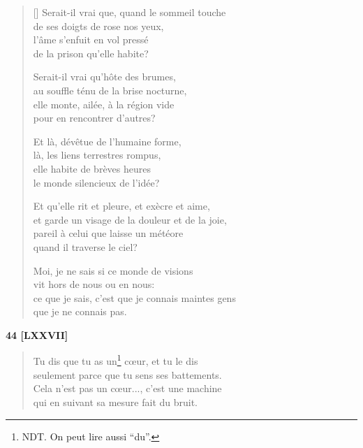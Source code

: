 \documentclass[a4paper,12pt]{book}
\begin{document}
\begin{verse}[\versewidth]
  Serait-il vrai que, quand le sommeil touche \\
  de ses doigts de rose nos yeux, \\
  l'âme s'enfuit en vol pressé \\
  de la prison qu'elle habite?

  Serait-il vrai qu'hôte des brumes, \\
  au souffle ténu de la brise nocturne, \\
  elle monte, ailée, à la région vide \\
  pour en rencontrer d'autres?

  Et là, dévêtue de l'humaine forme, \\
  là, les liens terrestres rompus, \\
  elle habite de brèves heures \\
  le monde silencieux de l'idée?

  Et qu'elle rit et pleure, et exècre et aime, \\
  et garde un visage de la douleur et de la joie, \\
  pareil à celui que laisse un météore \\
  quand il traverse le ciel?

  Moi, je ne sais si ce monde de visions \\
  vit hors de nous ou en nous: \\
  ce que je sais, c'est que je connais maintes gens \\
  que je ne connais pas.
\end{verse}


\bigskip

\begin{center} {\bf 44 [LXXVII]} \end{center}

\begin{verse}
Tu dis que tu as un\footnote{NDT. On peut lire aussi ``du''.} c{\oe}ur, et tu le dis \\
seulement parce que tu sens ses battements. \\
Cela n'est pas un c{\oe}ur..., c'est une machine \\
qui en suivant sa mesure fait du bruit. \\
\end{verse}

\bigskip
\end{document}
